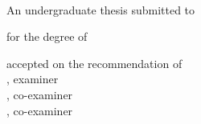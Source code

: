 \manualmark
{} %

\begin{titlepage}
	\begin{addmargin}[-1cm]{-3cm}
    \begin{center}
        \large
        \begingroup
        \endgroup

        \hfill

        \vfill

        \begingroup
            \spacedallcaps{\myTitleOnTitlePageLineOne}\\
            \spacedallcaps{\myTitleOnTitlePageLineTwo}
        \endgroup

        \vfill

        \begingroup
            An undergraduate thesis submitted to\\
        \endgroup
        
        \vfill

        \begingroup
            for the degree of\\
        \endgroup

        \vfill

        \vfill

        \begingroup
            accepted on the recommendation of\\
            \myProfA, examiner\\
            \myProfB, co-examiner\\
            \mySupervisor, co-examiner
        \endgroup

        \vfill

        \myTime

        \vfill                      

    \end{center}  
  \end{addmargin}       
\end{titlepage}

